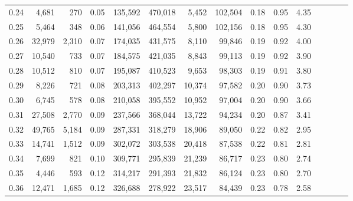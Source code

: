 \begin{tabular}{rrrcrrrrrrrrrrr}
0.24 &   4,681 &    270 &                                       0.05 &  135,592 &  470,018 &    5,452 &  102,504 &  0.18 &  0.95 &                         4.35 \\
0.25 &   5,464 &    348 &                                       0.06 &  141,056 &  464,554 &    5,800 &  102,156 &  0.18 &  0.95 &                         4.30 \\
0.26 &  32,979 &  2,310 &                                       0.07 &  174,035 &  431,575 &    8,110 &   99,846 &  0.19 &  0.92 &                         4.00 \\
0.27 &  10,540 &    733 &                                       0.07 &  184,575 &  421,035 &    8,843 &   99,113 &  0.19 &  0.92 &                         3.90 \\
0.28 &  10,512 &    810 &                                       0.07 &  195,087 &  410,523 &    9,653 &   98,303 &  0.19 &  0.91 &                         3.80 \\
0.29 &   8,226 &    721 &                                       0.08 &  203,313 &  402,297 &   10,374 &   97,582 &  0.20 &  0.90 &                         3.73 \\
0.30 &   6,745 &    578 &                                       0.08 &  210,058 &  395,552 &   10,952 &   97,004 &  0.20 &  0.90 &                         3.66 \\
0.31 &  27,508 &  2,770 &                                       0.09 &  237,566 &  368,044 &   13,722 &   94,234 &  0.20 &  0.87 &                         3.41 \\
0.32 &  49,765 &  5,184 &                                       0.09 &  287,331 &  318,279 &   18,906 &   89,050 &  0.22 &  0.82 &                         2.95 \\
0.33 &  14,741 &  1,512 &                                       0.09 &  302,072 &  303,538 &   20,418 &   87,538 &  0.22 &  0.81 &                         2.81 \\
0.34 &   7,699 &    821 &                                       0.10 &  309,771 &  295,839 &   21,239 &   86,717 &  0.23 &  0.80 &                         2.74 \\
0.35 &   4,446 &    593 &                                       0.12 &  314,217 &  291,393 &   21,832 &   86,124 &  0.23 &  0.80 &                         2.70 \\
0.36 &  12,471 &  1,685 &                                       0.12 &  326,688 &  278,922 &   23,517 &   84,439 &  0.23 &  0.78 &                         2.58 \\

\end{tabular}

